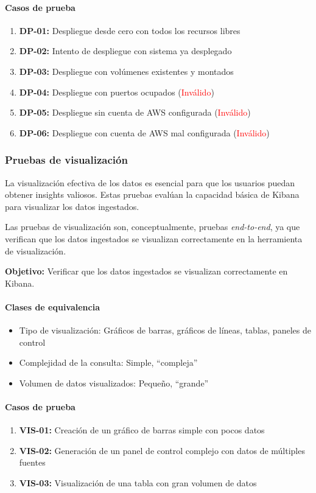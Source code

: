 \paragraph{Casos de prueba}
\begin{enumerate}
    \item \textbf{DP-01:} Despliegue desde cero con todos los recursos libres
    \item \textbf{DP-02:} Intento de despliegue con sistema ya desplegado
    \item \textbf{DP-03:} Despliegue con volúmenes existentes y montados
    \item \textbf{DP-04:} Despliegue con puertos ocupados (\textcolor{red}{Inválido})
    \item \textbf{DP-05:} Despliegue sin cuenta de AWS configurada (\textcolor{red}{Inválido})
    \item \textbf{DP-06:} Despliegue con cuenta de AWS mal configurada (\textcolor{red}{Inválido})
\end{enumerate}


\newpage{}
\subsubsection{Pruebas de visualización}
La visualización efectiva de los datos es esencial para que los usuarios
puedan obtener insights valiosos. Estas pruebas evalúan la capacidad básica
de Kibana para visualizar los datos ingestados.

Las pruebas de visualización son, conceptualmente, pruebas \textit{end-to-end},
ya que verifican que los datos ingestados se visualizan correctamente en la
herramienta de visualización.

\textbf{Objetivo:} Verificar que los datos ingestados se visualizan
correctamente en Kibana.

\paragraph{Clases de equivalencia}
\begin{itemize}
    \item Tipo de visualización: Gráficos de barras, gráficos de líneas,
        tablas, paneles de control
    \item Complejidad de la consulta: Simple, ``compleja''
    \item Volumen de datos visualizados: Pequeño, ``grande''
\end{itemize}

\paragraph{Casos de prueba}
\begin{enumerate}
    \item \textbf{VIS-01:} Creación de un gráfico de barras simple con pocos datos
    \item \textbf{VIS-02:} Generación de un panel de control complejo con datos de múltiples fuentes
    \item \textbf{VIS-03:} Visualización de una tabla con gran volumen de datos
\end{enumerate}



